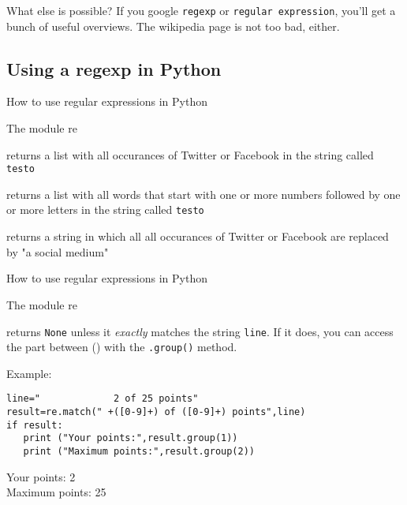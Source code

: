 \documentclass{beamer}
\begin{document}
\begin{frame}{What else is possible?}
If you google {\tt{regexp}} or {\tt{regular expression}}, you'll get a bunch of useful overviews. The wikipedia page is not too bad, either. 
\end{frame}

\subsection{Using a regexp in Python}
\begin{frame}{How to use regular expressions in Python}
\begin{block}{The module re}
\begin{description}
\item<1->[{\tt{re.findall("\lbrack Tt\rbrack witter|\lbrack Ff\rbrack acebook",testo)}}] returns a list with all occurances of Twitter or Facebook in the string called {\tt{testo}}
\item<1->[{\tt{re.findall("\lbrack 0-9\rbrack +\lbrack a-zA-Z\rbrack +",testo)}}] returns a list with all words that start with one or more numbers followed by one or more letters in the string called {\tt{testo}}
\item<2->[{\tt{re.sub("\lbrack Tt\rbrack witter|\lbrack Ff\rbrack acebook","a social medium",testo)}}] returns a string in which all all occurances of Twitter or Facebook are replaced by "a social medium"
\end{description}
\end{block}
\end{frame}


\begin{frame}[fragile]{How to use regular expressions in Python}
\begin{block}{The module re}
\begin{description}
\item<1->[{\tt{re.match(" +(\lbrack 0-9\rbrack +) of (\lbrack 0-9\rbrack +) points",line)}}] returns  \texttt{None} unless it \emph{exactly} matches the string \texttt{line}. If it does, you can access the part between () with the \texttt{.group()} method.
\end{description}
\end{block}

Example:
\begin{lstlisting}
line="             2 of 25 points"
result=re.match(" +([0-9]+) of ([0-9]+) points",line)
if result:
   print ("Your points:",result.group(1))
   print ("Maximum points:",result.group(2))
\end{lstlisting}
Your points: 2\\
Maximum points: 25
\end{frame}
\end{document}
